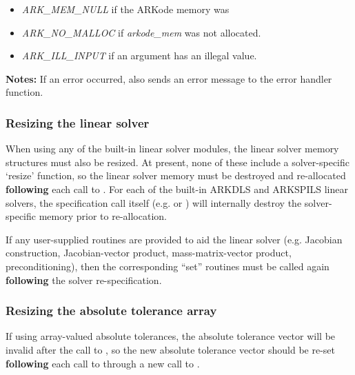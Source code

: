 \documentclass[letterpaper,10pt,english]{sphinxmanual}
\begin{document}
\begin{fulllineitems}
\begin{description}
\begin{itemize}
\item {} 
\emph{ARK\_MEM\_NULL}  if the ARKode memory was 

\item {} 
\emph{ARK\_NO\_MALLOC} if \emph{arkode\_mem} was not allocated.

\item {} 
\emph{ARK\_ILL\_INPUT} if an argument has an illegal value.

\end{itemize}

\end{description}

\textbf{Notes:} If an error occurred, {\hyperref[c_interface/User_callable:ARKodeResize]{}} also sends an error
message to the error handler function.

\end{fulllineitems}



\subsubsection{Resizing the linear solver}
\label{c_interface/User_callable:resizing-the-linear-solver}
When using any of the built-in linear solver modules, the linear
solver memory structures must also be resized.  At present, none of
these include a solver-specific `resize' function, so the linear
solver memory must be destroyed and re-allocated \textbf{following} each
call to {\hyperref[c_interface/User_callable:ARKodeResize]{}}.  For each of the built-in ARKDLS and
ARKSPILS linear solvers, the specification call itself
(e.g. {\hyperref[c_interface/User_callable:ARKDense]{}} or {\hyperref[c_interface/User_callable:ARKSpgmr]{}}) will internally
destroy the solver-specific memory prior to re-allocation.

If any user-supplied routines are provided to aid the linear solver
(e.g. Jacobian construction, Jacobian-vector product,
mass-matrix-vector product, preconditioning), then the corresponding
``set'' routines must be called again \textbf{following} the solver
re-specification.


\subsubsection{Resizing the absolute tolerance array}
\label{c_interface/User_callable:resizing-the-absolute-tolerance-array}
If using array-valued absolute tolerances, the absolute tolerance
vector will be invalid after the call to {\hyperref[c_interface/User_callable:ARKodeResize]{}}, so
the new absolute tolerance vector should be re-set \textbf{following} each
call to {\hyperref[c_interface/User_callable:ARKodeResize]{}} through a new call to
{\hyperref[c_interface/User_callable:ARKodeSVtolerances]{}}.
\end{document}
